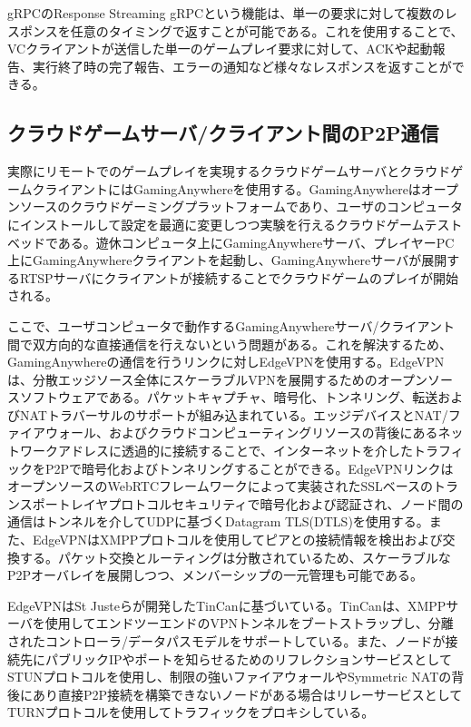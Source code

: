 gRPCのResponse Streaming gRPCという機能は、単一の要求に対して複数のレスポンスを任意のタイミングで返すことが可能である。これを使用することで、VCクライアントが送信した単一のゲームプレイ要求に対して、ACKや起動報告、実行終了時の完了報告、エラーの通知など様々なレスポンスを返すことができる。

\subsection{クラウドゲームサーバ/クライアント間のP2P通信}
実際にリモートでのゲームプレイを実現するクラウドゲームサーバとクラウドゲームクライアントにはGamingAnywhereを使用する。GamingAnywhereはオープンソースのクラウドゲーミングプラットフォームであり、ユーザのコンピュータにインストールして設定を最適に変更しつつ実験を行えるクラウドゲームテストベッドである。遊休コンピュータ上にGamingAnywhereサーバ、プレイヤーPC上にGamingAnywhereクライアントを起動し、GamingAnywhereサーバが展開するRTSPサーバにクライアントが接続することでクラウドゲームのプレイが開始される。

ここで、ユーザコンピュータで動作するGamingAnywhereサーバ/クライアント間で双方向的な直接通信を行えないという問題がある。これを解決するため、GamingAnywhereの通信を行うリンクに対しEdgeVPN\cite{edgevpn}を使用する。EdgeVPNは、分散エッジソース全体にスケーラブルVPNを展開するためのオープンソースソフトウェアである。パケットキャプチャ、暗号化、トンネリング、転送およびNATトラバーサルのサポートが組み込まれている。エッジデバイスとNAT/ファイアウォール、およびクラウドコンピューティングリソースの背後にあるネットワークアドレスに透過的に接続することで、インターネットを介したトラフィックをP2Pで暗号化およびトンネリングすることができる。EdgeVPNリンクはオープンソースのWebRTCフレームワークによって実装されたSSLベースのトランスポートレイヤプロトコルセキュリティで暗号化および認証され、ノード間の通信はトンネルを介してUDPに基づくDatagram TLS(DTLS)\cite{dtlc}を使用する。また、EdgeVPNはXMPPプロトコル\cite{xmpp}を使用してピアとの接続情報を検出および交換する。パケット交換とルーティングは分散されているため、スケーラブルなP2Pオーバレイを展開しつつ、メンバーシップの一元管理も可能である。

EdgeVPNはSt Justeら\cite{tincan}が開発したTinCanに基づいている。TinCanは、XMPPサーバを使用してエンドツーエンドのVPNトンネルをブートストラップし、分離されたコントローラ/データパスモデルをサポートしている。また、ノードが接続先にパブリックIPやポートを知らせるためのリフレクションサービスとしてSTUNプロトコル\cite{stun}を使用し、制限の強いファイアウォールやSymmetric NATの背後にあり直接P2P接続を構築できないノードがある場合はリレーサービスとしてTURNプロトコル\cite{turn}を使用してトラフィックをプロキシしている。

